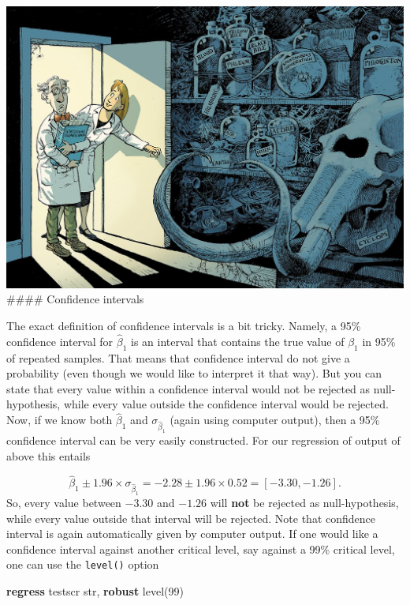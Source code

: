 \documentclass[
]{book}
\newenvironment{Shaded}{\begin{snugshade}}{\end{snugshade}}
\newcommand{\DecValTok}[1]{\textcolor[rgb]{0.00,0.00,0.81}{#1}}
\newcommand{\KeywordTok}[1]{\textcolor[rgb]{0.13,0.29,0.53}{\textbf{#1}}}
\newcommand{\NormalTok}[1]{#1}
\begin{document}
\includegraphics{./figures/significance.jpg}
\#\#\#\# Confidence intervals

The exact definition of confidence intervals is a bit tricky. Namely, a 95\% confidence interval for \(\hat{\beta}_1\) is an interval that contains the true value of \(\beta_1\) in 95\% of repeated samples. That means that confidence interval do not give a probability (even though we would like to interpret it that way). But you can state that every value within a confidence interval would not be rejected as null-hypothesis, while every value outside the confidence interval would be rejected. Now, if we know both \(\hat{\beta}_1\) and \(\sigma_{\hat{\beta}_1}\) (again using computer output), then a 95\% confidence interval can be very easily constructed. For our regression of output of above this entails

\begin{equation*}
\hat{\beta}_1 \pm 1.96 \times \sigma_{\hat{\beta}_1} = -2.28 \pm 1.96 \times 0.52 = [-3.30, -1.26].
\label{eq:olsci}
\end{equation*}
So, every value between \(-3.30\) and \(-1.26\) will \textbf{not} be rejected as null-hypothesis, while every value outside that interval will be rejected. Note that confidence interval is again automatically given by computer output. If one would like a confidence interval against another critical level, say against a 99\% critical level, one can use the \texttt{level()} option

\begin{Shaded}
\begin{Highlighting}[]
\KeywordTok{regress}\NormalTok{ testscr str, }\KeywordTok{robust} \DecValTok{level}\NormalTok{(99)}
\end{Highlighting}
\end{Shaded}
\end{document}
